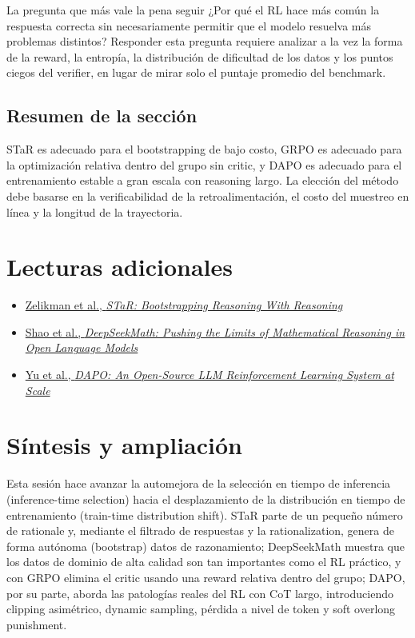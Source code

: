 \documentclass[a4paper]{article}
\begin{document}

\begin{importantbox}{La pregunta que más vale la pena seguir}
¿Por qué el RL hace más común la respuesta correcta sin necesariamente permitir que el modelo resuelva más problemas distintos? Responder esta pregunta requiere analizar a la vez la forma de la reward, la entropía, la distribución de dificultad de los datos y los puntos ciegos del verifier, en lugar de mirar solo el puntaje promedio del benchmark.
\end{importantbox}

\subsection{Resumen de la sección}

STaR es adecuado para el bootstrapping de bajo costo, GRPO es adecuado para la optimización relativa dentro del grupo sin critic, y DAPO es adecuado para el entrenamiento estable a gran escala con reasoning largo. La elección del método debe basarse en la verificabilidad de la retroalimentación, el costo del muestreo en línea y la longitud de la trayectoria.
\section{Lecturas adicionales}

\begin{itemize}
    \item \href{https://arxiv.org/abs/2203.14465}{Zelikman et al., \emph{STaR: Bootstrapping Reasoning With Reasoning}}
    \item \href{https://arxiv.org/abs/2402.03300}{Shao et al., \emph{DeepSeekMath: Pushing the Limits of Mathematical Reasoning in Open Language Models}}
    \item \href{https://arxiv.org/abs/2503.14476}{Yu et al., \emph{DAPO: An Open-Source LLM Reinforcement Learning System at Scale}}
\end{itemize}

\section{Síntesis y ampliación}

Esta sesión hace avanzar la automejora de la selección en tiempo de inferencia (inference-time selection) hacia el desplazamiento de la distribución en tiempo de entrenamiento (train-time distribution shift). STaR parte de un pequeño número de rationale y, mediante el filtrado de respuestas y la rationalization, genera de forma autónoma (bootstrap) datos de razonamiento; DeepSeekMath muestra que los datos de dominio de alta calidad son tan importantes como el RL práctico, y con GRPO elimina el critic usando una reward relativa dentro del grupo; DAPO, por su parte, aborda las patologías reales del RL con CoT largo, introduciendo clipping asimétrico, dynamic sampling, pérdida a nivel de token y soft overlong punishment.
\end{document}
